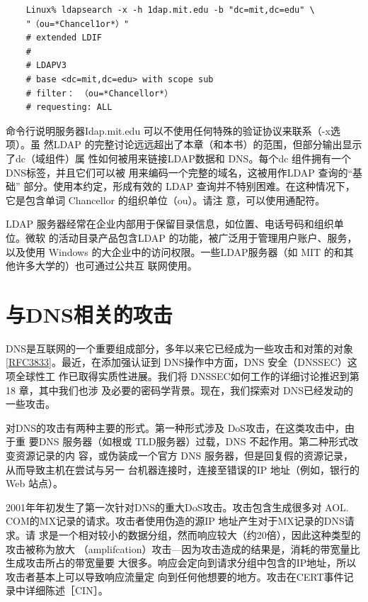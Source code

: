 \begin{verbatim}
    Linux% ldapsearch -x -h 1dap.mit.edu -b "dc=mit,dc=edu" \
    "（ou=*Chancel1or*）"
    # extended LDIF
    #
    # LDAPV3
    # base <dc=mit,dc=edu> with scope sub
    # filter： （ou=*Chancellor*）
    # requesting: ALL
\end{verbatim}

命令行说明服务器Idap.mit.edu 可以不使用任何特殊的验证协议来联系（-x选项）。虽
然LDAP 的完整讨论远远超出了本章（和本书）的范围，但部分输出显示了dc（域组件）属
性如何被用来链接LDAP数据和 DNS。每个dc 组件拥有一个 DNS标签，并且它们可以被
用来编码一个完整的域名，这被用作LDAP 查询的“基础” 部分。使用本约定，形成有效的
LDAP 查询并不特别困难。在这种情况下，它是包含单词 Chancellor 的组织单位（ou）。请注
意，可以使用通配符。

LDAP 服务器经常在企业内部用于保留目录信息，如位置、电话号码和组织单位。微软
的活动目录产品包含LDAP 的功能，被广泛用于管理用户账户、服务，以及使用 Windows
的大企业中的访问权限。一些LDAP服务器（如 MIT 的和其他许多大学的）也可通过公共互
联网使用。

\section{与DNS相关的攻击}

DNS是互联网的一个重要组成部分，多年以来它已经成为一些攻击和对策的对象
\href{https://www.rfc-editor.org/rfc/rfc3833}{[RFC3833]}。最近，在添加强认证到
DNS操作中方面，DNS 安全（DNSSEC）这项全球性工
作已取得实质性进展。我们将 DNSSEC如何工作的详细讨论推迟到第18 章，其中我们也涉
及必要的密码学背景。现在，我们探索对 DNS已经发动的一些攻击。

对DNS的攻击有两种主要的形式。第一种形式涉及 DoS攻击，在这类攻击中，由于重
要DNS 服务器（如根或 TLD服务器）过载，DNS 不起作用。第二种形式改变资源记录的内
容，或伪装成一个官方 DNS 服务器，但是回复假的资源记录，从而导致主机在尝试与另一
台机器连接时，连接至错误的IP 地址（例如，银行的Web 站点）。

2001年年初发生了第一次针对DNS的重大DoS攻击。攻击包含生成很多对 AOL.
COM的MX记录的请求。攻击者使用伪造的源IP 地址产生对于MX记录的DNS请求。请
求是一个相对较小的数据分组，然而响应较大（约20倍），因此这种类型的攻击被称为放大
（amplifcation）攻击—因为攻击造成的结果是，消耗的带宽量比生成攻击所占的带宽量要
大很多。响应会定向到请求分组中包含的IP地址，所以攻击者基本上可以导致响应流量定
向到任何他想要的地方。攻击在CERT事件记录中详细陈述［CIN］。

